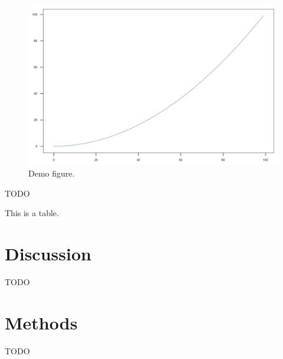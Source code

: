 \documentclass[a4paper,10pt,abstracton]{scrartcl}
\begin{document}
\begin{figure}[t!]
  \includegraphics[width=1.1\linewidth,center]{artwork/demo.png}
  \caption{Demo figure.}
  \label{fig:demo}
\end{figure}

TODO

\begin{table}[h]
  \centering
  
  \caption{This is a table.}
  \label{table:demo}
\end{table}

\section*{Discussion}

TODO

\section*{Methods}

TODO
\end{document}
